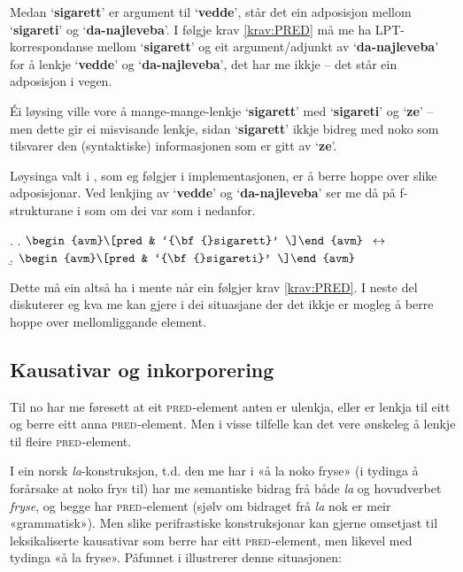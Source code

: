 \documentclass[11pt,a4paper,oneside,draft]{report}
\newcommand{\F}[2]{\textsc{#1}\ensuremath{_{#2}}}
\newcommand{\PRED}{\F{pred}{}}
\newcommand{\p}[1]{`\textbf{#1}'}
\begin{document}
 Medan \p{sigarett} er argument til \p{vedde}, står det ein adposisjon
 mellom \p{sigareti} og \p{da-najleveba}. I følgje krav
 \ref{krav:PRED} må me ha LPT-korrespondanse mellom \p{sigarett} og
 eit argument/adjunkt av \p{da-najleveba} for å lenkje \p{vedde} og
 \p{da-najleveba}, det har me ikkje -- det står ein adposisjon i vegen.

 Éi løysing ville vore å mange-mange-lenkje \p{sigarett} med
 \p{sigareti} og \p{ze} -- men dette gir ei misvisande lenkje, sidan
 \p{sigarett} ikkje bidreg med noko som tilsvarer den (syntaktiske)
 informasjonen som er gitt av \p{ze}. 

 Løysinga valt i \citet[s.~75,~fotnote~3]{dyvik2009lmp}, som eg
 følgjer i implementasjonen, er å berre hoppe over slike
 adposisjonar. Ved lenkjing av \p{vedde} og \p{da-najleveba} ser me
 då på f-strukturane i \Last som om dei var som i \Next nedanfor.

{\avmoptions{}
\ex. \a. $\begin{avm}\[pred & `{\bf{}sigarett}' \]\end{avm}\\$
     $\\\leftrightarrow$\\
     \b.     $\begin{avm}\[pred & `{\bf{}sigareti}' \]\end{avm}$

}

 Dette må ein altså ha i mente når ein følgjer krav \ref{krav:PRED}. I
 neste del diskuterer eg kva me kan gjere i dei situasjane der det
 ikkje er mogleg å berre hoppe over mellomliggande element.

\subsection{Kausativar og inkorporering}
\label{sec-3.6.5}

\label{SEC:f-mange-mange}

Til no har me føresett at eit \PRED{}-element anten er ulenkja, eller
er lenkja til eitt og berre eitt anna \PRED{}-element. Men i visse
tilfelle kan det vere ønskeleg å lenkje til fleire \PRED{}-element.

I ein norsk \emph{la}-konstruksjon, t.d. den me har i «å la noko fryse» (i
tydinga å forårsake at noko frys til) har me semantiske bidrag frå
både \emph{la} og hovudverbet \emph{fryse}, og begge har \PRED{}-element (sjølv om
bidraget frå \emph{la} nok er meir «grammatisk»). Men slike perifrastiske
konstruksjonar kan gjerne omsetjast til leksikaliserte kausativar som
berre har eitt \PRED{}-element, men likevel med tydinga «å la
fryse». Påfunnet i \Next illustrerer denne situasjonen:
\end{document}
